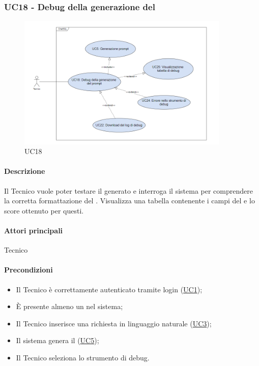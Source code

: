 \subsubsection{UC18 - Debug della generazione del }\label{UC18}

\begin{figure}[H]
  \centering
  \includegraphics[width=0.90\textwidth]{assets/uc18.png}
  \caption{UC18}
\end{figure}


\paragraph*{Descrizione}
Il Tecnico vuole poter testare il  generato e interroga il sistema per comprendere la corretta formattazione del . Visualizza una tabella contenente i campi del  e lo score ottenuto per questi.

\paragraph*{Attori principali}
Tecnico

\paragraph*{Precondizioni}
\begin{itemize}
  \item Il Tecnico è correttamente autenticato tramite login (\hyperref[UC1]{UC1});
  \item È presente almeno un  nel sistema;
  \item Il Tecnico inserisce una richiesta in linguaggio naturale (\hyperref[UC3]{UC3});
  \item Il sistema genera il  (\hyperref[UC5]{UC5});
  \item Il Tecnico seleziona lo strumento di debug.
\end{itemize}

